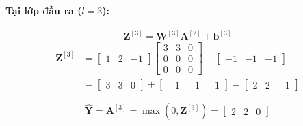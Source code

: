 \paragraph{Tại lớp đầu ra ($l=3$):}
\[
\mathbf{Z}^{[3]} = \mathbf{W}^{[3]}\mathbf{A}^{[2]} + \mathbf{b}^{[3]}
\]
\begin{align*}
\mathbf{Z}^{[3]} 
&= 
\begin{bmatrix}
    1 & 2 & -1
\end{bmatrix}
\begin{bmatrix}
    3 & 3 & 0 \\
    0 & 0 & 0 \\
    0 & 0 & 0
\end{bmatrix}
+
\begin{bmatrix}
    -1 & -1 & -1
\end{bmatrix} \\
&= 
\begin{bmatrix}
    3 & 3 & 0
\end{bmatrix}
+
\begin{bmatrix}
    -1 & -1 & -1
\end{bmatrix}
= 
\begin{bmatrix}
    2 & 2 & -1
\end{bmatrix}
\end{align*}

\[
\hat{\mathbf{Y}} = \mathbf{A}^{[3]} = \max(0, \mathbf{Z}^{[3]}) = 
\begin{bmatrix}
    2 & 2 & 0
\end{bmatrix}
\]

